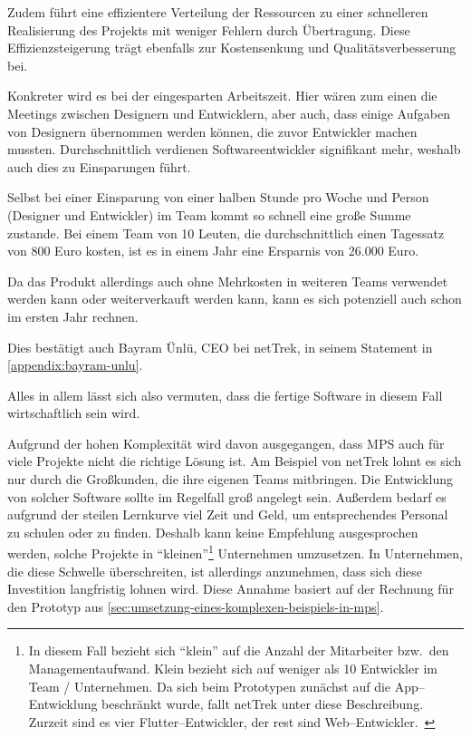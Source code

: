 Zudem führt eine effizientere Verteilung der Ressourcen zu einer schnelleren Realisierung des Projekts mit weniger Fehlern durch Übertragung.
Diese Effizienzsteigerung trägt ebenfalls zur Kostensenkung und Qualitätsverbesserung bei.

Konkreter wird es bei der eingesparten Arbeitszeit.
Hier wären zum einen die Meetings zwischen Designern und Entwicklern, aber auch, dass einige Aufgaben von Designern übernommen werden können, die zuvor Entwickler machen mussten.
Durchschnittlich verdienen Softwareentwickler signifikant mehr, weshalb auch dies zu Einsparungen führt.~\autocite{gehaltde-2024B,gehaltde-2024A}

Selbst bei einer Einsparung von einer halben Stunde pro Woche und Person (Designer und Entwickler) im Team kommt so schnell eine große Summe zustande.
Bei einem Team von 10 Leuten, die durchschnittlich einen Tagessatz von 800 Euro kosten, ist es in einem Jahr eine Ersparnis von 26.000 Euro.

Da das Produkt allerdings auch ohne Mehrkosten in weiteren Teams verwendet werden kann oder weiterverkauft werden kann, kann es sich potenziell auch schon im ersten Jahr rechnen.

Dies bestätigt auch Bayram Ünlü, \ac{CEO} bei \ac{netTrek}, in seinem Statement in \autoref{appendix:bayram-unlu}.

Alles in allem lässt sich also vermuten, dass die fertige Software in diesem Fall wirtschaftlich sein wird.

Aufgrund der hohen Komplexität wird davon ausgegangen, dass \ac{MPS} auch für viele Projekte nicht die richtige Lösung ist.
Am Beispiel von \ac{netTrek} lohnt es sich nur durch die Großkunden, die ihre eigenen Teams mitbringen.
Die Entwicklung von solcher Software sollte im Regelfall groß angelegt sein.
Außerdem bedarf es aufgrund der steilen Lernkurve viel Zeit und Geld, um entsprechendes Personal zu schulen oder zu finden.
Deshalb kann keine Empfehlung ausgesprochen werden, solche Projekte in \enquote{kleinen}\footnote{In diesem Fall bezieht sich \enquote{klein} auf die Anzahl der Mitarbeiter bzw.\ den Managementaufwand. Klein bezieht sich auf weniger als 10 Entwickler im Team / Unternehmen. Da sich beim Prototypen zunächst auf die App--Entwicklung beschränkt wurde, fallt \ac{netTrek} unter diese Beschreibung. Zurzeit sind es vier Flutter--Entwickler, der rest sind Web--Entwickler.~\autocite{nettrek-gmbh-co-kg-no-date}} Unternehmen umzusetzen.
In Unternehmen, die diese Schwelle überschreiten, ist allerdings anzunehmen, dass sich diese Investition langfristig lohnen wird.
Diese Annahme basiert auf der Rechnung für den Prototyp aus \autoref{sec:umsetzung-eines-komplexen-beispiels-in-mps}.
